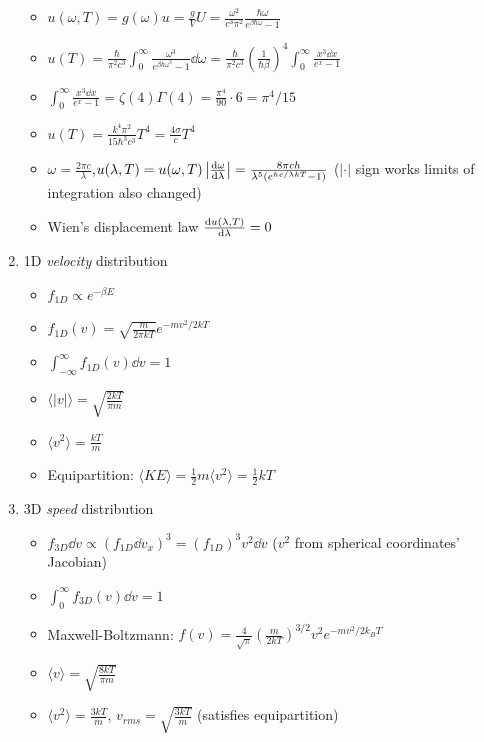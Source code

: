 \documentclass{article}
\theoremstyle{remark}
\begin{document}
\begin{enumerate}
\begin{itemize}
            \item $u(\omega,T)=g(\omega)u=\frac{g}{V}U = \boxed{\frac{\omega^2}{c^3\pi^2}\frac{\hbar\omega}{e^{\beta\hbar\omega}-1}}$
            \item $u(T)=\frac{\hbar}{\pi^2c^3}\int_0^\infty\frac{\omega^3}{e^{\beta\hbar\omega^3}-1}\dd\omega=\frac{\hbar}{\pi^2c^3}\left(\frac{1}{\hbar\beta}\right)^4\int_0^\infty\frac{x^3\dd x}{e^x-1}$
            \item $\int_0^\infty\frac{x^3\dd x}{e^x-1}=\zeta(4)\Gamma(4)=\frac{\pi^4}{90}\cdot6 = \pi^4/15$
            \item $u(T)=\frac{k^4\pi^2}{15\hbar^3c^3}T^4=\frac{4\sigma}{c} T^4$
            \item $\omega=\frac{2\pi c}{\lambda}$,$u(\lambda,T)=u(\omega,T)\left|\dv{\omega}{\lambda}\right|=\frac{8\pi ch}{\lambda^5(e^{hc/\lambda kT}-1)}$ ($|\cdot|$ sign works limits of integration also changed)
            \item Wien's displacement law $\dv{u(\lambda,T)}{\lambda}=0$
        \end{itemize}
    \item 1D \emph{velocity} distribution\begin{itemize}
            \item $f_{1D}\propto e^{-\beta E}$
            \item $f_{1D}(v)=\sqrt{\frac{m}{2\pi kT}}e^{-mv^2/2kT}$
            \item $\int_{-\infty}^\infty f_{1D}(v)\dd v=1$
            \item $\langle |v|\rangle=\sqrt{\frac{2kT}{\pi m}}$
            \item $\langle v^2\rangle=\frac{kT}{m}$
            \item Equipartition: $\langle KE\rangle=\frac{1}{2}m\langle v^2\rangle=\frac{1}{2}kT$
        \end{itemize}
    \item 3D \emph{speed} distribution\begin{itemize}
            \item $f_{3D}\dd v\propto (f_{1D}\dd v_x)^3=(f_{1D})^3v^2\dd v$ ($v^2$ from spherical coordinates' Jacobian)
            \item $\int_0^\infty f_{3D}(v)\dd v=1$
            \item Maxwell-Boltzmann: $f(v)=\frac{4}{\sqrt{\pi}}\left(\frac{m}{2kT}\right)^{3/2}v^2e^{-mv^2/2k_BT}$
            \item $\langle v\rangle=\sqrt{\frac{8kT}{\pi m}}$
            \item $\langle v^2\rangle=\frac{3kT}{m}$, $v_{rms}=\sqrt{\frac{3kT}{m}}$ (satisfies equipartition)

\end{itemize}
\end{enumerate}
\end{document}
